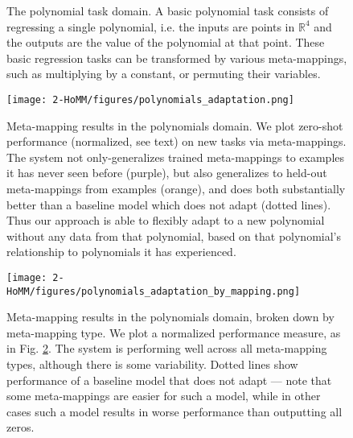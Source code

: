 \begin{figure}[htbp]
\caption[The polynomial task domain.]{The polynomial task domain. A basic polynomial task consists of regressing a single polynomial, i.e. the inputs are points in \(\mathbb{R}^4\) and the outputs are the value of the polynomial at that point. These basic regression tasks can be transformed by various meta-mappings, such as multiplying by a constant, or permuting their variables. }\label{fig:HoMM_polynomials:tasks}
\end{figure}

\begin{figure}[htbp]
\centering
\texttt{[image: 2-HoMM/figures/polynomials\_adaptation.png]}
\caption[Meta-mapping results in the polynomials domain.]{Meta-mapping results in the polynomials domain. We plot zero-shot performance (normalized, see text) on new tasks via meta-mappings. The system not only-generalizes trained meta-mappings to examples it has never seen before (purple), but also generalizes to held-out meta-mappings from examples (orange), and does both substantially better than a baseline model which does not adapt (dotted lines). Thus our approach is able to flexibly adapt to a new polynomial without any data from that polynomial, based on that polynomial's relationship to polynomials it has experienced.}\label{fig:HoMM_polynomials:results}
\end{figure}

\begin{figure}[htbp]
\centering
\texttt{[image: 2-HoMM/figures/polynomials\_adaptation\_by\_mapping.png]}
\caption[Meta-mapping results in the polynomial domain, broken down by meta-mapping type.]{Meta-mapping results in the polynomials domain, broken down by meta-mapping type. We plot a normalized performance measure, as in Fig. \ref{fig:HoMM_polynomials:results}. The system is performing well across all meta-mapping types, although there is some variability. Dotted lines show performance of a baseline model that does not adapt --- note that some meta-mappings are easier for such a model, while in other cases such a model results in worse performance than outputting all zeros.} \label{fig:HoMM_polynomials:results_by_mapping}
\end{figure}

